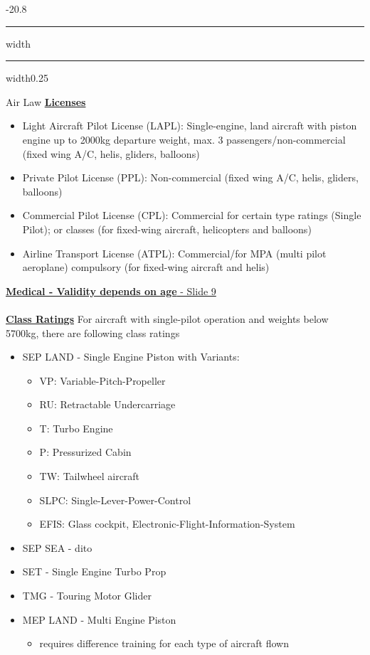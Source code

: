 \documentclass[9pt, landscape, fleqn]{scrartcl}
\makeatletter
\renewcommand{\section}{\@startsection{section}{1}{0mm}%
{-2\baselineskip}{0.8\baselineskip}%
{\hrule depth 0.2pt width\columnwidth\hrule depth1.5pt
width0.25\columnwidth\vspace*{1.2em}\Large\bfseries\rmfamily}}
\makeatother
\begin{document}
\begin{multicols*}{3}
\section{Air Law}
\underline{\textbf{Licenses}}
\begin{itemize}
    \item Light Aircraft Pilot License (LAPL): Single-engine, land aircraft with piston engine up to 2000kg departure weight, max. 3 passengers/non-commercial (fixed wing A/C, helis, gliders, balloons)
    \item Private Pilot License (PPL): Non-commercial (fixed wing A/C, helis, gliders, balloons)
    \item Commercial Pilot License (CPL): Commercial for certain type ratings (Single Pilot); or classes (for fixed-wing aircraft, helicopters and balloons)
    \item Airline Transport License (ATPL): Commercial/for MPA (multi pilot aeroplane) compulsory (for fixed-wing aircraft and helis)
\end{itemize}
\underline{\textbf{Medical - Validity depends on age} - Slide 9} \\ \\
\underline{\textbf{Class Ratings}}
For aircraft with single-pilot operation and weights below 5700kg, there are following class ratings
\begin{itemize}
    \item SEP LAND - Single Engine Piston with Variants:
    \begin{itemize}
        \item VP: Variable-Pitch-Propeller
        \item RU: Retractable Undercarriage 
        \item T: Turbo Engine 
        \item P: Pressurized Cabin 
        \item TW: Tailwheel aircraft 
        \item SLPC: Single-Lever-Power-Control 
        \item EFIS: Glass cockpit, Electronic-Flight-Information-System
    \end{itemize}
    \item SEP SEA - dito 
    \item SET - Single Engine Turbo Prop 
    \item TMG - Touring Motor Glider 
    \item MEP LAND - Multi Engine Piston
    \begin{itemize}
        \item requires difference training for each type of aircraft flown

\end{itemize}
\end{itemize}
\end{multicols*}
\end{document}
